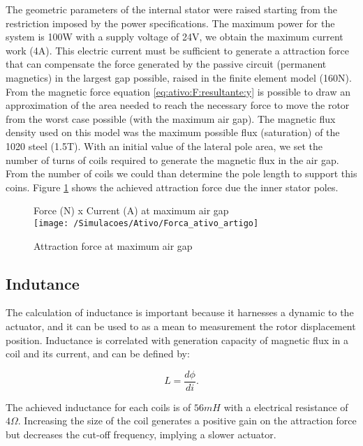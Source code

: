 \documentclass[10pt,fleqn,a4paper,twoside]{article}
\begin{document}
The geometric parameters of the internal stator were raised starting from the restriction imposed by the power specifications. The maximum power for the system is 100W with a  supply voltage of 24V, we obtain the maximum current work (4A). This electric current must be sufficient to generate a attraction force that can compensate the force generated by the passive circuit (permanent magnetics) in the largest gap possible, raised in the finite element model (160N). From the magnetic force equation \eqref{eq:ativo:F:resultante:y} is possible to draw an approximation of the area needed to reach the necessary force to move the rotor from the worst case possible (with the maximum air gap). The magnetic flux density used on this model was the maximum possible flux (saturation) of the 1020 steel (1.5T). With an initial value of the lateral pole area, we set the number of turns of coils required to generate the magnetic flux in the air gap. From the number of coils we could than determine the pole length to support this coins. Figure \ref{fig:magnetico:ativo:comsol} shows the achieved attraction force due the inner stator poles. 

\begin{figure}
\centering
Force (N) x Current (A) at maximum air gap\\
\texttt{[image: /Simulacoes/Ativo/Forca\_ativo\_artigo]}
\caption{Attraction force at maximum air gap }
\label{fig:magnetico:ativo:comsol}
\end{figure}

\subsection{Indutance} \label{subsec:at:indutancia}

The calculation of inductance is important because it harnesses a dynamic to the actuator, and it can be used to as a mean to measurement the rotor displacement position. Inductance is correlated with generation capacity of magnetic flux in a coil and its current, and can be defined by:

\begin{equation}
	L = \frac{d \phi}{di} .
\end{equation}

The achieved inductance for each coils is of $56 mH$ with a electrical resistance of $4 \Omega$. Increasing the size of the coil generates a positive gain on the attraction force but decreases the cut-off frequency, implying a slower actuator.
\end{document}
